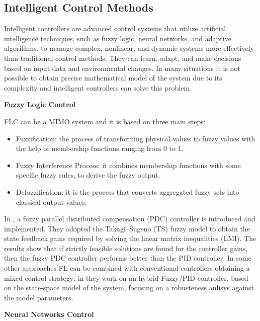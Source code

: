 \subsection{Intelligent Control Methods}
\label{subsec:Intelligent Control Methods}

Intelligent controllers are advanced control systems that utilize artificial intelligence techniques, such as fuzzy logic, neural networks, and adaptive algorithms, to manage complex, nonlinear, and dynamic systems more effectively than traditional control methods. They can learn, adapt, and make decisions based on input data and environmental changes.
In many situations it is not possible to obtain precise mathematical model of the system due to its complexity and intelligent controllers can solve this problem.

\textbf{Fuzzy Logic Control}

FLC can be a MIMO system and it is based on three main steps:

\begin{itemize}
    \item Fuzzification: the process of transforming physical values to fuzzy values with the help of membership functions ranging from 0 to 1.
    \item Fuzzy Interference Process: it combines membership functions with some specific fuzzy rules, to derive the fuzzy output. 
    \item Defuzzification: it is the process that converts aggregated fuzzy sets into classical output values.
\end{itemize}
In \cite{Ahmad-et-al}, a fuzzy parallel distributed compensation (PDC) controller is introduced and implemented. They adopted the Takagi–Sugeno (TS) fuzzy model to obtain the state feedback gains required by solving the linear matrix inequalities (LMI). The results show that if strictly feasible solutions are found for the controller gains, then the fuzzy PDC controller performs better than the PID controller.
In some other approaches FL can be combined with conventional controllers obtaining a mixed control strategy: in \cite{Goher-et-al, Wu-et-al} they work on an hybrid Fuzzy/PID controller, based on the state-space model of the system, focusing on a robusteness anlisys against the model parameters.

\textbf{Neural Networks Control}

